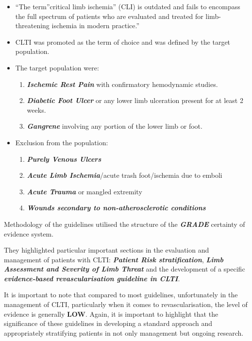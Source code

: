 \documentclass[
]{book}
\begin{document}
\begin{itemize}
\item
  ``The term''critical limb ischemia'' (CLI) is outdated and fails to
  encompass the full spectrum of patients who are evaluated and treated
  for limb-threatening ischemia in modern practice.''
\item
  CLTI was promoted as the term of choice and was defined by the target
  population.
\item
  The target population were:

  \begin{enumerate}
  \def\labelenumi{\arabic{enumi}.}
  \item
    \textbf{\emph{Ischemic Rest Pain}} with confirmatory hemodynamic studies.
  \item
    \textbf{\emph{Diabetic Foot Ulcer}} or any lower limb ulceration present for
    at least 2 weeks.
  \item
    \textbf{\emph{Gangrene}} involving any portion of the lower limb or foot.
  \end{enumerate}
\item
  Exclusion from the population:

  \begin{enumerate}
  \def\labelenumi{\arabic{enumi}.}
  \item
    \textbf{\emph{Purely Venous Ulcers}}
  \item
    \textbf{\emph{Acute Limb Ischemia}}/acute trash foot/ischemia due to emboli
  \item
    \textbf{\emph{Acute Trauma}} or mangled extremity
  \item
    \textbf{\emph{Wounds secondary to non-atherosclerotic conditions}}
  \end{enumerate}
\end{itemize}

Methodology of the guidelines utilised the structure of the \textbf{\emph{GRADE}}
certainty of evidence system.

They highlighted particular important sections in the evaluation and
management of patients with CLTI: \textbf{\emph{Patient Risk stratification}},
\textbf{\emph{Limb Assessment and Severity of Limb Threat}} and the development of a
specific \textbf{\emph{evidence-based revascularisation guideline in CLTI}}.

It is important to note that compared to most guidelines, unfortunately in
the management of CLTI, particularly when it comes to revascularisation, the
level of evidence is generally \textbf{LOW}. Again, it is important to highlight
that the significance of these guidelines in developing a standard approach
and appropriately stratifying patients in not only management
but ongoing research.
\end{document}
